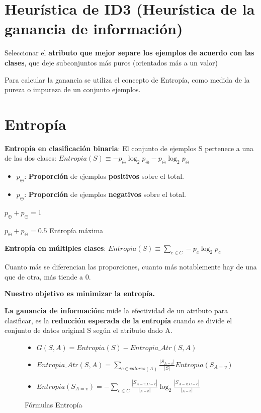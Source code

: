 \documentclass[12pt, twoside, openright]{report} %
\begin{document}
\section{Heurística de ID3 (Heurística de la ganancia de
  información)}

Seleccionar el \textbf{atributo que mejor separe los ejemplos de acuerdo
	con las clases}, que deje subconjuntos más puros (orientados más a un
valor)

Para calcular la ganancia se utiliza el concepto de Entropía, como medida de la pureza o impureza de un conjunto ejemplos.
\pagebreak
\section{Entropía}

\textbf{Entropía en clasificación binaria}: El conjunto de ejemplos S
pertenece a una de las dos clases:
\textbf{\(Entropia(S) \equiv -p_\oplus \log _2 p_\oplus -p_\ominus \log _2 p_\ominus\)}

\begin{itemize}
	\item \(p_\oplus\): \textbf{Proporción} de ejemplos \textbf{positivos} sobre el total.
	\item \(p_\ominus\): \textbf{Proporción} de ejemplos \textbf{negativos} sobre el total.
\end{itemize}

\(p_\oplus+p_\ominus=1\)

\(p_\oplus+p_\ominus=0.5\) Entropía máxima

\textbf{Entropía en múltiples clases}:
\(Entropia(S) \equiv \sum_{c\in C} -p_c \log _2 p_c\)

Cuanto más se diferencian las proporciones, cuanto más notablemente hay de una que de otra, más tiende a 0.

\textbf{Nuestro objetivo es minimizar la entropía.}

\textbf{La ganancia de información:} mide la efectividad de un atributo
para clasificar, es la \textbf{reducción esperada de la entropía} cuando
se divide el conjunto de datos original S según el atributo dado A.
\begin{figure}[H]
	\begin{itemize}
		\item \(G(S, A)=Entropia(S) - Entropia\_ Atr(S, A)\)
		\item \(Entropia\_ Atr(S, A)= \sum_{c \in valores(A)} \frac {|S_{A=v}|}{|S|} Entropia(S_{A=v})\)
		\item \(Entropia(S_{A=v})= -\sum_{c \in C} \frac {|S_{A=v, C=c}|}{|_{A=v}|} \log_2 \frac {|S_{A=v,C=c}|}{|_{A=v}|}\)
	\end{itemize}
	\captionsetup{justification=centering}
	\caption{Fórmulas Entropía}
\end{figure}
\end{document}
